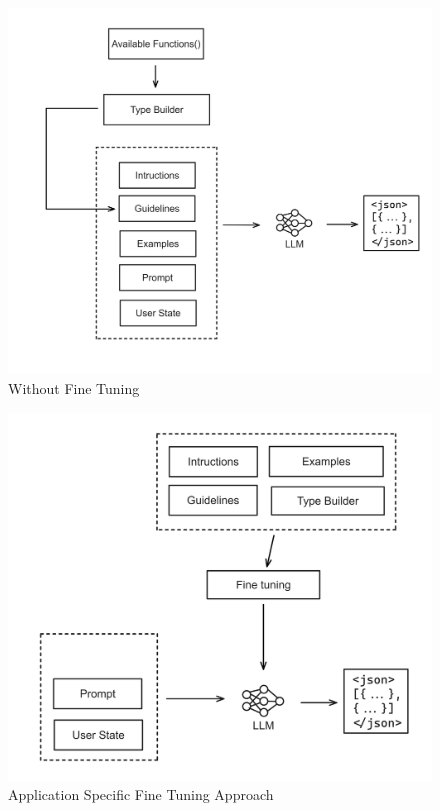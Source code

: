 \begin{figure}[h!]
    \centering
    \includegraphics[width=\textwidth]
    {Images/Block_Diag/Without-Fine-Tuning.png}
    \caption{Without Fine Tuning}
\end{figure}
\begin{figure}[h!]
    \centering
    \includegraphics[width=\textwidth]
    {Images/Block_Diag/Fine-Tuning.png}
    \caption{Application Specific Fine Tuning Approach}
\end{figure}

